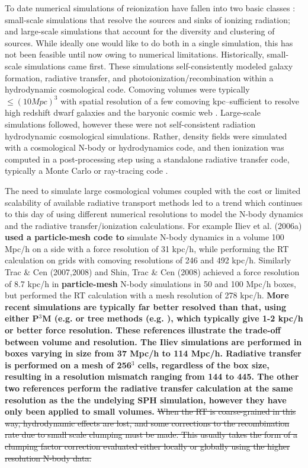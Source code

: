 To date numerical simulations of reionization have fallen into two basic classes \citep{TracGnedin2011}: small-scale simulations that resolve the sources and sinks of ionizing radiation; and large-scale simulations that account for the diversity and clustering of sources. While ideally one would like to do both in a single simulation, this has not been feasible until now owing to numerical limitations. Historically, small-scale simulations came first. These simulations self-consistently modeled galaxy formation, radiative transfer, and photoionization/recombination within a hydrodynamic cosmological code. Comoving volumes were typically $\leq (10 Mpc)^3$ with spatial resolution of a few comoving kpc--sufficient to resolve high redshift dwarf galaxies and the baryonic cosmic web  \citep{Gnedin00a,RazoumovEtAl2002,RicottiEtAl2002,Petkova11,Finlator11}. Large-scale simulations followed, however these were not self-consistent radiation hydrodynamic cosmological simulations. Rather, density fields were simulated with a cosmological N-body or hydrodynamics code, and then ionization was computed in a post-processing step using a standalone radiative transfer code, typically a Monte Carlo or ray-tracing code
\citep{Ciardi01,Sokasian02,Sokasian03,Iliev06,Zahn07,TracCen2007,TracCenLoeb2008,ShinTracCen2008,Finlator09}.

The need to simulate large cosmological volumes coupled with the cost or limited scalability of available radiative transport methods led to a trend which continues to this day of using different numerical resolutions to model the N-body dynamics and the radiative transfer/ionization calculations. For example Iliev et al. (2006a) {\bf used a particle-mesh code to}
simulate N-body dynamics in a volume 100 Mpc/h on a side with a force resolution of 31 kpc/h, while performing the RT calculation on grids with comoving resolutions of 246 and 492 kpc/h. Similarly Trac \& Cen (2007,2008) and Shin, Trac \& Cen (2008) achieved a force resolution of 8.7 kpc/h in {\bf particle-mesh} N-body simulations in 50 and 100 Mpc/h boxes, but performed the RT calculation with a mesh resolution of 278 kpc/h. 
{\bf More recent simulations are typically far better resolved than that, using either P$^3$M (e.g. \cite{Iliev2012} or tree methods (e.g. \cite{PawlikSchaye2011, Petkova11}), which typically give 1-2 kpc/h or better force resolution. These references illustrate the trade-off between volume and resolution. The Iliev simulations are performed in boxes varying in size from 37 Mpc/h to 114 Mpc/h. Radiative transfer is performed on a mesh of 256$^3$ cells, regardless of the box size, resulting in a resolution mismatch ranging from 144 to 445. The other two references perform the radiative transfer calculation at the same resolution as the the undelying SPH simulation, however they have only been applied to small volumes.  } \st{When the RT is coarse-grained in this way, hydrodynamic effects are lost, and some corrections to the recombination rate due to small scale clumping must be made. This usually takes the form of a clumping factor correction evaluated either locally or globally using the higher resolution N-body data.} 

